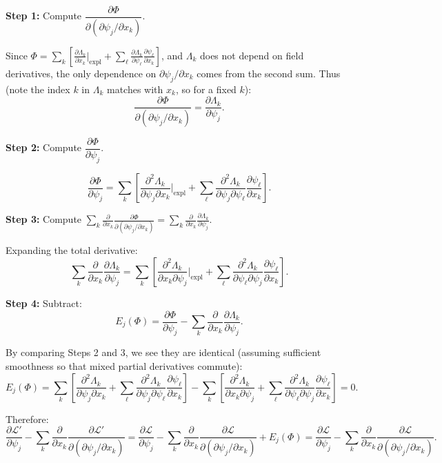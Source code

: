 \documentclass[12pt]{article}
\begin{document}
\medskip
\noindent\textbf{Step 1:} Compute $\dfrac{\partial\Phi}{\partial(\partial\psi_j/\partial x_k)}$.

Since $\Phi = \sum_k\left[\frac{\partial\Lambda_k}{\partial x_k}\big|_{\text{expl}} + \sum_\ell \frac{\partial\Lambda_k}{\partial\psi_\ell}\frac{\partial\psi_\ell}{\partial x_k}\right]$, and $\Lambda_k$ does not depend on field derivatives, the only dependence on $\partial\psi_j/\partial x_k$ comes from the second sum. Thus (note the index $k$ in $\Lambda_k$ matches with $x_k$, so for a fixed $k$):
\[
  \frac{\partial\Phi}{\partial(\partial\psi_j/\partial x_k)} = \frac{\partial\Lambda_k}{\partial\psi_j}.
\]

\medskip
\noindent\textbf{Step 2:} Compute $\dfrac{\partial\Phi}{\partial\psi_j}$.

\[
  \frac{\partial\Phi}{\partial\psi_j} = \sum_k \left[\frac{\partial^2\Lambda_k}{\partial\psi_j\partial x_k}\bigg|_{\text{expl}} + \sum_\ell \frac{\partial^2\Lambda_k}{\partial\psi_j\partial\psi_\ell}\frac{\partial\psi_\ell}{\partial x_k}\right].
\]

\medskip
\noindent\textbf{Step 3:} Compute $\displaystyle\sum_k \frac{\partial}{\partial x_k}\frac{\partial\Phi}{\partial(\partial\psi_j/\partial x_k)} = \sum_k \frac{\partial}{\partial x_k}\frac{\partial\Lambda_k}{\partial\psi_j}$.

Expanding the total derivative:
\[
  \sum_k \frac{\partial}{\partial x_k}\frac{\partial\Lambda_k}{\partial\psi_j}
  = \sum_k\left[\frac{\partial^2\Lambda_k}{\partial x_k\partial\psi_j}\bigg|_{\text{expl}} + \sum_\ell\frac{\partial^2\Lambda_k}{\partial\psi_\ell\partial\psi_j}\frac{\partial\psi_\ell}{\partial x_k}\right].
\]

\medskip
\noindent\textbf{Step 4:} Subtract:
\[
  E_j(\Phi) = \frac{\partial\Phi}{\partial\psi_j} - \sum_k\frac{\partial}{\partial x_k}\frac{\partial\Lambda_k}{\partial\psi_j}.
\]

By comparing Steps 2 and 3, we see they are identical (assuming sufficient smoothness so that mixed partial derivatives commute):
\[
  E_j(\Phi) = \sum_k\left[\frac{\partial^2\Lambda_k}{\partial\psi_j\partial x_k} + \sum_\ell\frac{\partial^2\Lambda_k}{\partial\psi_j\partial\psi_\ell}\frac{\partial\psi_\ell}{\partial x_k}\right]
  - \sum_k\left[\frac{\partial^2\Lambda_k}{\partial x_k\partial\psi_j} + \sum_\ell\frac{\partial^2\Lambda_k}{\partial\psi_\ell\partial\psi_j}\frac{\partial\psi_\ell}{\partial x_k}\right] = 0.
\]

Therefore:
\[
  \frac{\partial\mathscr{L}'}{\partial\psi_j} - \sum_k\frac{\partial}{\partial x_k}\frac{\partial\mathscr{L}'}{\partial(\partial\psi_j/\partial x_k)}
  = \frac{\partial\mathscr{L}}{\partial\psi_j} - \sum_k\frac{\partial}{\partial x_k}\frac{\partial\mathscr{L}}{\partial(\partial\psi_j/\partial x_k)} + E_j(\Phi)
  = \frac{\partial\mathscr{L}}{\partial\psi_j} - \sum_k\frac{\partial}{\partial x_k}\frac{\partial\mathscr{L}}{\partial(\partial\psi_j/\partial x_k)}.
\]
\end{document}
